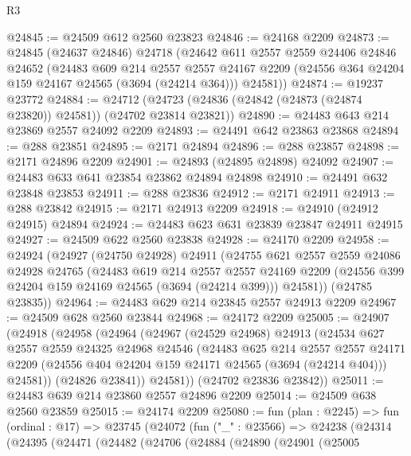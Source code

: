 \begin{lexlean}{R3}
\begin{coremodule}
@24845 := @24509 @612 @2560 @23823
@24846 := @24168 @2209
@24873 := @24845
    (@24637 @24846)
    @24718
    (@24642
      @611
      @2557
      @2559
      @24406
      @24846
      @24652
      (@24483
        @609
        @214
        @2557
        @2557
        @24167
        @2209
        (@24556 @364 @24204 @159 @24167 @24565 (@3694 (@24214 @364)))
        @24581))
@24874 := @19237 @23772
@24884 := @24712 (@24723 (@24836 (@24842 (@24873 (@24874 @23820)) @24581)) (@24702 @23814 @23821))
@24890 := @24483 @643 @214 @23869 @2557 @24092 @2209
@24893 := @24491 @642 @23863 @23868
@24894 := @288 @23851
@24895 := @2171 @24894
@24896 := @288 @23857
@24898 := @2171 @24896 @2209
@24901 := @24893 (@24895 @24898) @24092
@24907 := @24483 @633 @641 @23854 @23862 @24894 @24898
@24910 := @24491 @632 @23848 @23853
@24911 := @288 @23836
@24912 := @2171 @24911
@24913 := @288 @23842
@24915 := @2171 @24913 @2209
@24918 := @24910 (@24912 @24915) @24894
@24924 := @24483 @623 @631 @23839 @23847 @24911 @24915
@24927 := @24509 @622 @2560 @23838
@24928 := @24170 @2209
@24958 := @24924
    (@24927
      (@24750 @24928)
      @24911
      (@24755
        @621
        @2557
        @2559
        @24086
        @24928
        @24765
        (@24483
          @619
          @214
          @2557
          @2557
          @24169
          @2209
          (@24556 @399 @24204 @159 @24169 @24565 (@3694 (@24214 @399)))
          @24581))
      (@24785 @23835))
@24964 := @24483 @629 @214 @23845 @2557 @24913 @2209
@24967 := @24509 @628 @2560 @23844
@24968 := @24172 @2209
@25005 := @24907
    (@24918
      (@24958
        (@24964
          (@24967
            (@24529 @24968)
            @24913
            (@24534
              @627
              @2557
              @2559
              @24325
              @24968
              @24546
              (@24483
                @625
                @214
                @2557
                @2557
                @24171
                @2209
                (@24556 @404 @24204 @159 @24171 @24565 (@3694 (@24214 @404)))
                @24581))
            (@24826 @23841))
          @24581))
      (@24702 @23836 @23842))
@25011 := @24483 @639 @214 @23860 @2557 @24896 @2209
@25014 := @24509 @638 @2560 @23859
@25015 := @24174 @2209
@25080 := fun (plan : @2245) =>
  fun (ordinal : @17) =>
  @23745
    (@24072
      (fun ("_" : @23566) =>
      @24238
        (@24314
          (@24395
            (@24471
              (@24482
                (@24706
                  (@24884
                    (@24890
                      (@24901
                        (@25005

\end{coremodule}
\end{lexlean}
